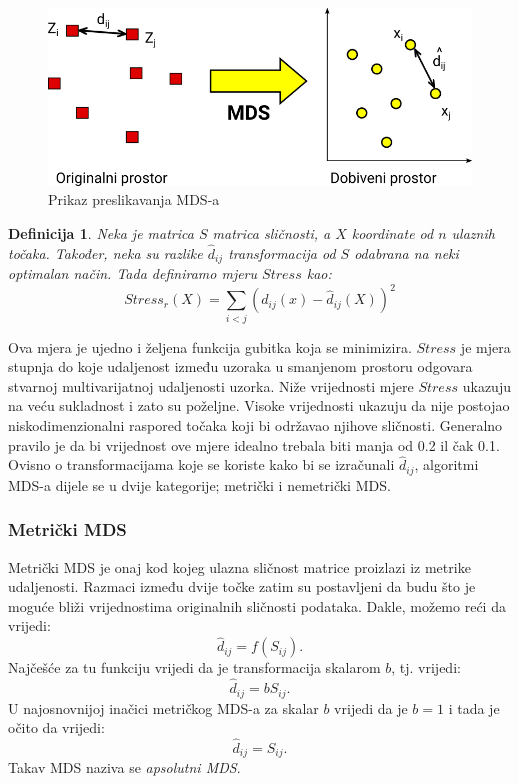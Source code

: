 \documentclass[times, utf8, diplomski]{fer}
\newtheorem{definition}{Definicija}         %
\begin{document}
\begin{figure}[htb]
    \centering
    \includegraphics[width=12cm]{resources/images/reduction/mds_mapping.png}
    \caption{Prikaz preslikavanja MDS-a}
    \label{fig:mds_mapping}
\end{figure}

\begin{definition}
    Neka je matrica $S$ matrica sličnosti, a $X$ koordinate od $n$ ulaznih točaka. Također, neka su razlike $\hat{d}_{ij}$ transformacija od $S$ odabrana na neki optimalan način. Tada definiramo mjeru $Stress$ kao:
    \begin{equation}
        Stress_r(X) = \sum_{i < j} (d_{ij}(x) - \hat{d}_{ij}(X))^2
    \end{equation}
\end{definition}
Ova mjera je ujedno i željena funkcija gubitka koja se minimizira. $Stress$ je mjera stupnja do koje udaljenost između uzoraka u smanjenom prostoru odgovara stvarnoj multivarijatnoj udaljenosti uzorka. Niže vrijednosti mjere $Stress$ ukazuju na veću sukladnost i zato su poželjne. Visoke vrijednosti ukazuju da nije postojao niskodimenzionalni raspored točaka koji bi održavao njihove sličnosti. Generalno pravilo je da bi vrijednost ove mjere idealno trebala biti manja od 0.2 il čak 0.1.
Ovisno o transformacijama koje se koriste kako bi se izračunali $\hat{d}_{ij}$, algoritmi MDS-a dijele se u dvije kategorije; metrički i nemetrički MDS.

\subsubsection{Metrički MDS}
Metrički MDS  je onaj kod kojeg ulazna sličnost matrice proizlazi iz metrike udaljenosti. Razmaci između dvije točke zatim su postavljeni da budu što je moguće bliži vrijednostima originalnih sličnosti podataka.
Dakle, možemo reći da vrijedi:
\begin{equation}
    \hat{d}_{ij} = f(S_{ij}).
\end{equation}
Najčešće za tu funkciju vrijedi da je transformacija skalarom $b$, tj. vrijedi:
\begin{equation}
    \hat{d}_{ij} = bS_{ij}.
\end{equation}
U najosnovnijoj inačici metričkog MDS-a za skalar $b$ vrijedi da je $b = 1$ i tada je očito da vrijedi:
\begin{equation}
    \hat{d}_{ij} = S_{ij}.
\end{equation}
Takav MDS naziva se \emph{apsolutni MDS}.
\end{document}
